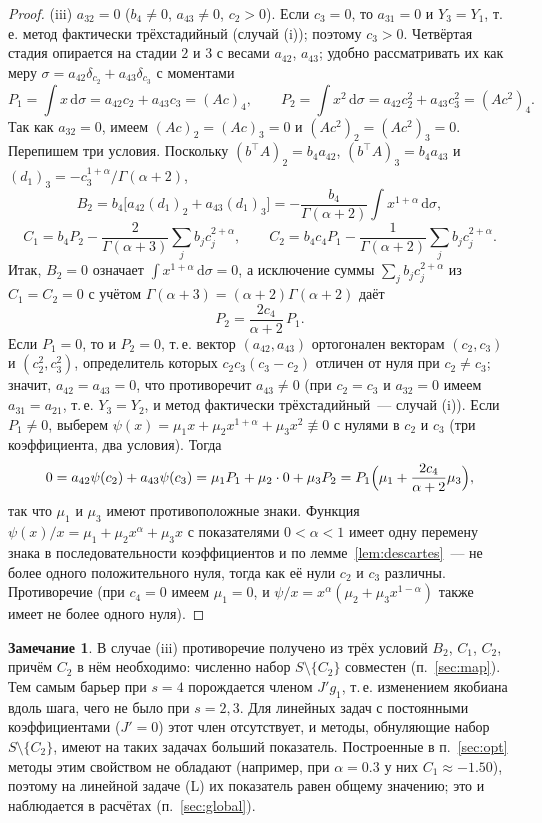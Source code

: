 \documentclass[11pt,a4paper]{article}
\theoremstyle{plain}
\theoremstyle{definition}
\newtheorem{remark}{Замечание}
\newcommand{\G}{\Gamma}
\newcommand{\dd}{\,\mathrm{d}}
\begin{document}
\begin{proof}
(iii) $a_{32}=0$ ($b_4\ne0$, $a_{43}\ne0$, $c_2>0$). Если $c_3=0$, то $a_{31}=0$ и $Y_3=Y_1$, т.\,е. метод фактически трёхстадийный (случай (i)); поэтому $c_3>0$. Четвёртая стадия опирается на стадии $2$ и $3$ с весами $a_{42}$, $a_{43}$; удобно рассматривать их как меру $\sigma=a_{42}\delta_{c_2}+a_{43}\delta_{c_3}$ с моментами
\[
P_1=\int x\dd\sigma=a_{42}c_2+a_{43}c_3=(Ac)_4,\qquad P_2=\int x^2\dd\sigma=a_{42}c_2^2+a_{43}c_3^2=(Ac^2)_4 .
\]
Так как $a_{32}=0$, имеем $(Ac)_2=(Ac)_3=0$ и $(Ac^2)_2=(Ac^2)_3=0$. Перепишем три условия. Поскольку $(b^{\top}A)_2=b_4a_{42}$, $(b^{\top}A)_3=b_4a_{43}$ и $(d_1)_3=-c_3^{1+\alpha}/\G(\alpha+2)$,
\[
B_2=b_4\bigl[a_{42}(d_1)_2+a_{43}(d_1)_3\bigr]=-\frac{b_4}{\G(\alpha+2)}\int x^{1+\alpha}\dd\sigma,
\]
\[
C_1=b_4P_2-\frac{2}{\G(\alpha+3)}\sum_jb_jc_j^{2+\alpha},\qquad C_2=b_4c_4P_1-\frac{1}{\G(\alpha+2)}\sum_jb_jc_j^{2+\alpha}.
\]
Итак, $B_2=0$ означает $\int x^{1+\alpha}\dd\sigma=0$, а исключение суммы $\sum_jb_jc_j^{2+\alpha}$ из $C_1=C_2=0$ с учётом $\G(\alpha+3)=(\alpha+2)\G(\alpha+2)$ даёт
\[
P_2=\frac{2c_4}{\alpha+2}\,P_1 .
\]
Если $P_1=0$, то и $P_2=0$, т.\,е. вектор $(a_{42},a_{43})$ ортогонален векторам $(c_2,c_3)$ и $(c_2^2,c_3^2)$, определитель которых $c_2c_3(c_3-c_2)$ отличен от нуля при $c_2\ne c_3$; значит, $a_{42}=a_{43}=0$, что противоречит $a_{43}\neq0$ (при $c_2=c_3$ и $a_{32}=0$ имеем $a_{31}=a_{21}$, т.\,е. $Y_3=Y_2$, и метод фактически трёхстадийный~--- случай (i)). Если $P_1\neq0$, выберем $\psi(x)=\mu_1x+\mu_2x^{1+\alpha}+\mu_3x^2\not\equiv0$ с нулями в $c_2$ и $c_3$ (три коэффициента, два условия). Тогда
\[
0=a_{42}\psi(c_2)+a_{43}\psi(c_3)=\mu_1P_1+\mu_2\cdot0+\mu_3P_2=P_1\Bigl(\mu_1+\frac{2c_4}{\alpha+2}\mu_3\Bigr),
\]
так что $\mu_1$ и $\mu_3$ имеют противоположные знаки. Функция $\psi(x)/x=\mu_1+\mu_2x^{\alpha}+\mu_3x$ с показателями $0<\alpha<1$ имеет одну перемену знака в последовательности коэффициентов и по лемме~\ref{lem:descartes}~--- не более одного положительного нуля, тогда как её нули $c_2$ и $c_3$ различны. Противоречие (при $c_4=0$ имеем $\mu_1=0$, и $\psi/x=x^{\alpha}(\mu_2+\mu_3x^{1-\alpha})$ также имеет не более одного нуля).
\end{proof}

\begin{remark}\label{rem:linear}
В случае (iii) противоречие получено из трёх условий $B_2$, $C_1$, $C_2$, причём $C_2$ в нём необходимо: численно набор $S\setminus\{C_2\}$ совместен (п.~\ref{sec:map}). Тем самым барьер при $s=4$ порождается членом $J'g_1$, т.\,е. изменением якобиана вдоль шага, чего не было при $s=2,3$. Для линейных задач с постоянными коэффициентами ($J'=0$) этот член отсутствует, и методы, обнуляющие набор $S\setminus\{C_2\}$, имеют на таких задачах больший показатель. Построенные в п.~\ref{sec:opt} методы этим свойством не обладают (например, при $\alpha=0.3$ у них $C_1\approx-1.50$), поэтому на линейной задаче (L) их показатель равен общему значению; это и наблюдается в расчётах (п.~\ref{sec:global}).
\end{remark}
\end{document}
